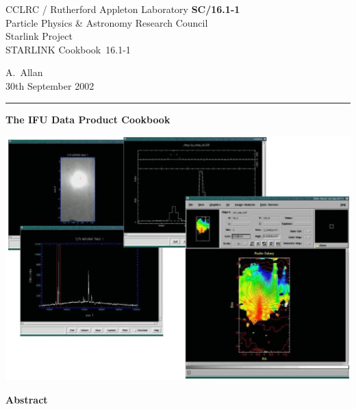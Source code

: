 \documentclass[twoside,11pt]{article}
\newcommand{\stardoccategory}  {STARLINK Cookbook}
\newcommand{\stardocinitials}  {SC}
\newcommand{\stardocnumber}    {16.1-1}
\newcommand{\stardocauthors}   {A.~Allan}
\newcommand{\stardocdate}      {30th September 2002}
\newcommand{\stardoctitle}     {The IFU Data Product Cookbook}
\newcommand{\stardocname}{\stardocinitials /\stardocnumber}
\newenvironment{latexonly}{}{}
\begin{document}
\thispagestyle{empty}

\begin{latexonly}
   CCLRC / {\sc Rutherford Appleton Laboratory} \hfill {\bf \stardocname}\\
   {\large Particle Physics \& Astronomy Research Council}\\
   {\large Starlink Project\\}
   {\large \stardoccategory\ \stardocnumber}
   \begin{flushright}
   \stardocauthors\\
   \stardocdate
   \end{flushright}
   \vspace{-4mm}
   \rule{\textwidth}{0.5mm}
   \vspace{5mm}
   \begin{center}
   {\Huge\bf  \stardoctitle \\ [2.5ex]}
   \end{center}
   \vspace{5mm}

   \begin{center}
   \includegraphics[scale=0.6]{sc16_cover.eps}
   \end{center}

   \vspace{5mm}
   \begin{center}
      {\Large\bf Abstract}
   \end{center}
\end{latexonly}
\end{document}
